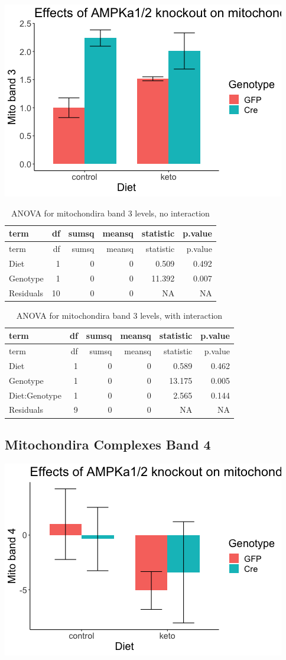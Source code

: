 \documentclass[
]{article}
\begin{document}
\includegraphics{figures/mitoband3-barplot-1.png}

\begin{longtable}[]{@{}lrrrrr@{}}
\caption{ANOVA for mitochondira band 3 levels, no
interaction}\tabularnewline
\toprule
term & df & sumsq & meansq & statistic & p.value\tabularnewline
\midrule
\endfirsthead
\toprule
term & df & sumsq & meansq & statistic & p.value\tabularnewline
\midrule
\endhead
Diet & 1 & 0 & 0 & 0.509 & 0.492\tabularnewline
Genotype & 1 & 0 & 0 & 11.392 & 0.007\tabularnewline
Residuals & 10 & 0 & 0 & NA & NA\tabularnewline
\bottomrule
\end{longtable}

\begin{longtable}[]{@{}lrrrrr@{}}
\caption{ANOVA for mitochondira band 3 levels, with
interaction}\tabularnewline
\toprule
term & df & sumsq & meansq & statistic & p.value\tabularnewline
\midrule
\endfirsthead
\toprule
term & df & sumsq & meansq & statistic & p.value\tabularnewline
\midrule
\endhead
Diet & 1 & 0 & 0 & 0.589 & 0.462\tabularnewline
Genotype & 1 & 0 & 0 & 13.175 & 0.005\tabularnewline
Diet:Genotype & 1 & 0 & 0 & 2.565 & 0.144\tabularnewline
Residuals & 9 & 0 & 0 & NA & NA\tabularnewline
\bottomrule
\end{longtable}

\hypertarget{mitochondira-complexes-band-4}{%
\subsection{Mitochondira Complexes Band
4}\label{mitochondira-complexes-band-4}}

\includegraphics{figures/mitoband4-barplot-1.png}
\end{document}
